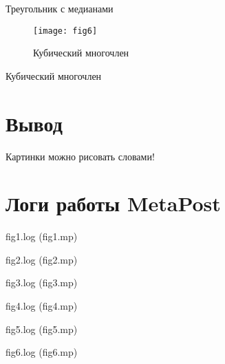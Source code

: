 \begin{program}
    
    \caption{Треугольник с медианами}
\end{program}

\clearpage

\begin{figure}[!h]
    \texttt{[image: fig6]}
    \centering
    \caption{Кубический многочлен}
\end{figure}

\begin{program}
    
    \caption{Кубический многочлен}
\end{program}

\chapter{Вывод}

Картинки можно рисовать словами\cite{mpost}!


  

\chapter*{Логи работы MetaPost}

\begin{log}
    
    \caption{fig1.log (fig1.mp)}
\end{log}

\begin{log}
    
    \caption{fig2.log (fig2.mp)}
\end{log}

\begin{log}
    
    \caption{fig3.log (fig3.mp)}
\end{log}

\begin{log}
    
    \caption{fig4.log (fig4.mp)}
\end{log}

\begin{log}
    
    \caption{fig5.log (fig5.mp)}
\end{log}

\begin{log}
    
    \caption{fig6.log (fig6.mp)}
\end{log}
